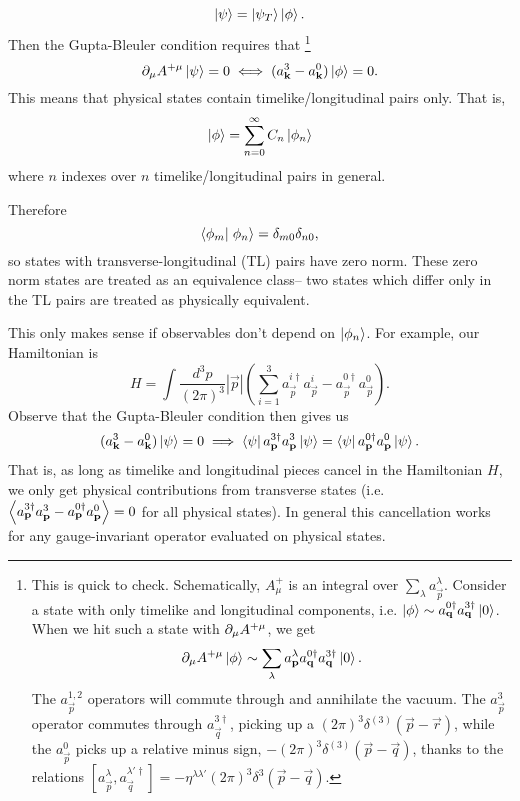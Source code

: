$$\left| \psi \right>=\left| \psi_T \right>\left| \phi \right>.$$
Then the Gupta-Bleuler condition requires that%
    \footnote{This is quick to check. Schematically, $A_\mu^+$ is an integral over $\sum_\lambda a_{\vec p}^\lambda$. Consider a state with only timelike and longitudinal components, i.e. $\left| \phi \right>\sim a_{\boldsymbol{\mathbf{q}}}^{0\dagger} a_{\boldsymbol{\mathbf{q}}}^{3\dagger} \left| 0 \right>$. When we hit such a state with $\partial_\mu A^{+\mu}$, we get
    \begin{equation*}
        \partial_\mu A^{+\mu} \left| \phi \right>\sim \sum_\lambda a_{\boldsymbol{\mathbf{p}}}^\lambda a_{\boldsymbol{\mathbf{q}}}^{0\dagger} a_{\boldsymbol{\mathbf{q}}}^{3\dagger} \left| 0 \right>.
    \end{equation*}
    The $a_{\vec p}^{1,2}$ operators will commute through and annihilate the vacuum. The $a^3_{\vec p}$ operator commutes through $a_{\vec q}^{3\dagger}$, picking up a $(2\pi)^3 \delta^{(3)}(\vec p-\vec r)$, while the $a^0_{\vec p}$ picks up a relative minus sign, $-(2\pi)^3 \delta^{(3)}(\vec p-\vec q)$, thanks to the relations $[a_{\vec p}^\lambda, a_{\vec q}^{\lambda' \dagger}]=-\eta^{\lambda \lambda'} (2\pi)^3 \delta^3(\vec p-\vec q)$.
    }
$$\partial_\mu A^{+\mu}\left| \psi \right>=0 \iff (a_{\boldsymbol{\mathbf{k}}}^3- a_{\boldsymbol{\mathbf{k}}}^0)\left| \phi \right>=0.$$
This means that physical states contain timelike/longitudinal pairs only. That is,
$$\left| \phi \right>=\sum_{n=0}^\infty C_n \left| \phi_n \right>$$
where $n$ indexes over $n$ timelike/longitudinal pairs in general.%

Therefore
$$\braket{\phi_m}{\phi_n}=\delta_{m0}\delta_{n0},$$ so states with transverse-longitudinal (TL) pairs have zero norm. These zero norm states are treated as an equivalence class-- two states which differ only in the TL pairs are treated as physically equivalent.

This only makes sense if observables don't depend on $\left| \phi_n \right>$. For example, our Hamiltonian is
$$H=\int \frac{d^3p}{(2\pi)^3} |\vec p| \left(\sum_{i=1}^3 a_{\vec p}^{i\dagger} a_{\vec p}^i - a_{\vec p}^{0\dagger} a_{\vec p}^0\right).$$
Observe that the Gupta-Bleuler condition then gives us
$$(a_{\boldsymbol{\mathbf{k}}}^3 -a_{\boldsymbol{\mathbf{k}}}^0)\left| \psi \right>=0 \implies \left< \psi \right| a_{\boldsymbol{\mathbf{p}}}^{3\dagger} a_{\boldsymbol{\mathbf{p}}}^3 \left| \psi \right>=\left< \psi \right| a_{\boldsymbol{\mathbf{p}}}^{0\dagger} a_{\boldsymbol{\mathbf{p}}}^0 \left| \psi \right>.$$
That is, as long as timelike and longitudinal pieces cancel in the Hamiltonian $H$, we only get physical contributions from transverse states (i.e. $\left< a_{\boldsymbol{\mathbf{p}}}^{3\dagger} a_{\boldsymbol{\mathbf{p}}}^3 -a_{\boldsymbol{\mathbf{p}}}^{0\dagger} a_{\boldsymbol{\mathbf{p}}}^0 \right> =0$ for all physical states).
In general this cancellation works for any gauge-invariant operator evaluated on physical states.

